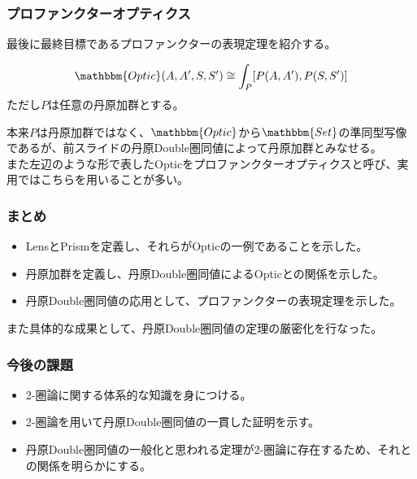 \documentclass[uplatex,dvipdfmx]{beamer}
\newcommand{\cat}[1]{\mathbbm{#1}}
\newcommand{\inset}[2]{[#1,#2]}
\begin{document}
  \begin{frame}\frametitle{プロファンクターオプティクス}
    最後に最終目標であるプロファンクターの表現定理を紹介する。
    \begin{theorem}[プロファンクターの表現定理]
      \[\cat{Optic}(A,A',S,S') \cong \int_P \inset{P(A,A')}{P(S,S')}\]
      ただし$P$は任意の丹原加群とする。
    \end{theorem}
    \vspace{\baselineskip}

    本来$P$は丹原加群ではなく、$\cat{Optic}$から$\cat{Set}$の準同型写像であるが、前スライドの丹原Double圏同値によって丹原加群とみなせる。\\
    \vspace{\baselineskip}
    また左辺のような形で表したOpticをプロファンクターオプティクスと呼び、実用ではこちらを用いることが多い。
  \end{frame}
  \begin{frame}
    \frametitle{まとめ}
    \begin{itemize}
      \item LensとPrismを定義し、それらがOpticの一例であることを示した。
      \item 丹原加群を定義し、丹原Double圏同値によるOpticとの関係を示した。
      \item 丹原Double圏同値の応用として、プロファンクターの表現定理を示した。
    \end{itemize}
    \vspace{\baselineskip}

    また具体的な成果として、丹原Double圏同値の定理の厳密化を行なった。

  \end{frame}
  \begin{frame}\frametitle{今後の課題}
    \begin{itemize}
      \item 2-圏論に関する体系的な知識を身につける。\\
      \vspace{\baselineskip}

      \item 2-圏論を用いて丹原Double圏同値の一貫した証明を示す。\\
      \vspace{\baselineskip}

      \item 丹原Double圏同値の一般化と思われる定理が2-圏論に存在するため、それとの関係を明らかにする。
    \end{itemize}
  \end{frame}
\end{document}
